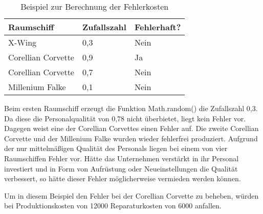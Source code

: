 \medskip

\begin{table}[htb]
     \centering
     \begin{tabular}{ | l | l | l | }
          \hline
          Raumschiff & Zufallszahl & Fehlerhaft? \\
          \hline \hline
          X-Wing & 0,3 & Nein \\ \hline
          Corellian Corvette & 0,9 & Ja \\ \hline
          Corellian Corvette & 0,7 & Nein \\ \hline
          Millenium Falke & 0,1 & Nein \\ \hline
     \end{tabular}
     \caption{Beispiel zur Berechnung der Fehlerkosten}
     \label{tab:spielwelt-logik-fehlerkosten-beispiel}
\end{table}

Beim ersten Raumschiff erzeugt die Funktion Math.random() die Zufallszahl 0,3. Da diese die Personalqualität
von 0,78 nicht überbietet, liegt kein Fehler vor. Dagegen weist eine der Corellian Corvettes einen Fehler auf.
Die zweite Corellian Corvette und der Millenium Falke wurden wieder fehlerfrei produziert.
Aufgrund der nur mittelmäßigen Qualität des Personals liegen bei einem von vier Raumschiffen Fehler vor. Hätte das
Unternehmen verstärkt in ihr Personal investiert und in Form von Aufrüstung oder Neueinstellungen die Qualität verbessert,
so hätte dieser Fehler möglicherweise vermieden werden können.

Um in diesem Beispiel den Fehler bei der Corellian Corvette zu beheben, würden bei Produktionskosten von 12000\curr{}
Reparaturkosten von 6000\curr{} anfallen.